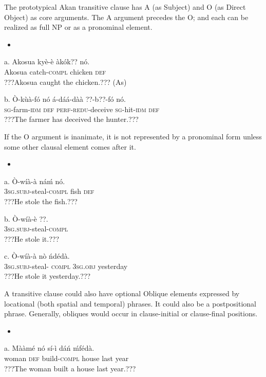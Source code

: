\documentclass[output=paper]{langsci/langscibook}
\begin{document}
The prototypical Akan transitive clause has A (as Subject) and O (as Direct Object) as core arguments. The A argument precedes the O; and each can be realized as full NP or as a pronominal element.

\begin{itemize}
\item \end{itemize}
\gll a.  Akosua    ky\`{e}-\`{e}    \`{a}k\'{o}k??    n\'{o}.\\
       Akosua  catch-\textsc{compl}  chicken  \textsc{def}\\
\glt   ???Akosua caught the chicken.??? (As)
\z

\gll  b.  \`{O}-k\`{u}\`{a}-f\'{o}    n\'{o}  \'{a}-d\'{a}\'{a}-d\`{a}\`{a}    ??{}-b??-f\'{o}    n\'{o}.\\
       \textsc{sg}{}-farm-\textsc{idm}    \textsc{def}  \textsc{perf-redu}{}-deceive  \textsc{sg}{}-hit-\textsc{idm}  \textsc{def}\\
\glt   ???The farmer has deceived the hunter.???
\z

If the O argument is inanimate, it is not represented by a pronominal form unless some other clausal element comes after it.

\begin{itemize}
\item \end{itemize}
\gll a.  \`{O}-w\'{i}\`{a}-\`{a}    n\'{a}\'{m}  n\'{o}.\\
       \textsc{3sg.subj}{}-steal-\textsc{compl}  fish  \textsc{def}\\
\glt   ???He stole the fish.???
\z

\gll  b.  \`{O}-w\'{i}\`{a}-\`{e}      ??.\\
       \textsc{3sg.subj}{}-steal-\textsc{compl}\\
\glt   ???He stole it.???
\z

\gll  c.  \`{O}-w\'{i}\`{a}-\`{a}      n\`{o}    \'{n}d\'{e}d\`{a}.\\
       \textsc{3sg.subj}{}-steal-\textsc{ compl}  \textsc{3sg.obj}  yesterday\\
\glt   ???He stole it yesterday.???
\z

A transitive clause could also have optional Oblique elements expressed by locational (both spatial and temporal) phrases. It could also be a postpositional phrase. Generally, obliques would occur in clause-initial or clause-final positions. 

\begin{itemize}
\item \end{itemize}
\gll a.  M\`{a}\`{a}m\'{e}    n\'{o}  s\'{i}-\`{i}    d\'{a}\'{n}  \'{m}f\'{e}d\`{a}.\\
       woman    \textsc{def}  build-\textsc{compl}  house  last year\\
\glt   ???The woman built a house last year.???
\z
\end{document}
